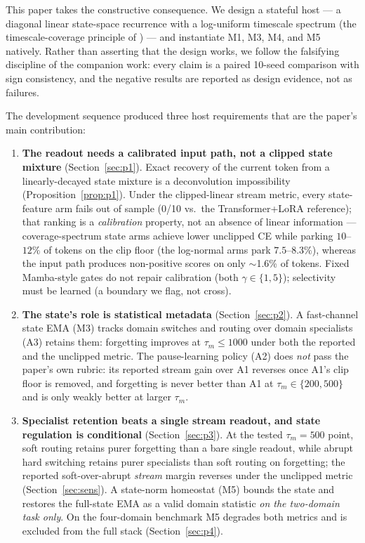 \documentclass[preprint,12pt]{elsarticle}
\begin{document}
This paper takes the constructive consequence. We design a stateful
host --- a diagonal linear state-space recurrence with a log-uniform
timescale spectrum (the timescale-coverage principle of
\cite{redemc}) --- and instantiate M1, M3, M4, and M5 natively.
Rather than asserting that the design works, we follow the falsifying
discipline of the companion work: every claim is a paired 10-seed
comparison with sign consistency, and the negative results are
reported as design evidence, not as failures.

The development sequence produced three host requirements that are
the paper's main contribution:

\begin{enumerate}
\item \textbf{The readout needs a calibrated input path, not a
   clipped state mixture}
   (Section~\ref{sec:p1}). Exact recovery of the current token from a
   linearly-decayed state mixture is a deconvolution impossibility
   (Proposition~\ref{prop:p1}). Under the clipped-linear stream metric,
   every state-feature arm fails out of sample (0/10 vs.\ the
   Transformer+LoRA reference); that ranking is a \emph{calibration}
   property, not an absence of linear information --- coverage-spectrum
   state arms achieve lower unclipped CE while parking $10$--$12\%$ of
   tokens on the clip floor (the log-normal arms park $7.5$--$8.3\%$),
   whereas the input path produces
   non-positive scores on only $\sim$1.6\% of tokens. Fixed Mamba-style
   gates do not repair calibration (both $\gamma\in\{1,5\}$); selectivity
   must be learned (a boundary we flag, not cross).
\item \textbf{The state's role is statistical metadata}
   (Section~\ref{sec:p2}). A fast-channel state EMA (M3) tracks domain
   switches and routing over domain specialists (A3) retains them:
   forgetting improves at $\tau_m\le1000$ under both the reported and
   the unclipped metric. The pause-learning policy (A2) does \emph{not}
   pass the paper's own rubric: its reported stream gain over A1
   reverses once A1's clip floor is removed, and forgetting is never
   better than A1 at $\tau_m\in\{200,500\}$ and is only weakly better
   at larger $\tau_m$.
\item \textbf{Specialist retention beats a single stream readout, and
   state regulation is conditional}
   (Section~\ref{sec:p3}). At the tested $\tau_m{=}500$ point, soft
   routing retains purer forgetting than a bare single readout, while
   abrupt hard switching retains purer specialists than soft routing
   on forgetting; the reported soft-over-abrupt \emph{stream} margin
   reverses under the unclipped metric (Section~\ref{sec:sens}). A
   state-norm homeostat (M5) bounds the state and restores the
   full-state EMA as a valid domain statistic \emph{on the two-domain
   task only}. On the four-domain benchmark M5 degrades both metrics
   and is excluded from the full stack (Section~\ref{sec:p4}).
\end{enumerate}
\end{document}
